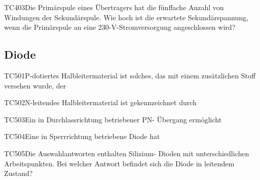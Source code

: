 \begin{question}{TC403}{Die Primärspule eines Übertragers hat die fünffache Anzahl von Windungen der Sekundärspule. Wie hoch ist die erwartete Sekundärspannung, wenn die Primärspule an eine 230-V-Stromversorgung angeschlossen wird?}
\end{question}

\subsection{Diode}

\begin{question}{TC501}{P-dotiertes Halbleitermaterial ist solches, das mit einem zusätzlichen Stoff versehen wurde, der}
\end{question}

\begin{question}{TC502}{N-leitendes Halbleitermaterial ist gekennzeichnet durch}
\end{question}

\begin{question}{TC503}{Ein in Durchlassrichtung betriebener PN- Übergang ermöglicht}
\end{question}

\begin{question}{TC504}{Eine in Sperrrichtung betriebene Diode hat}
\end{question}

\begin{question}{TC505}{Die Auswahlantworten enthalten Silizium- Dioden mit unterschiedlichen Arbeitspunkten. Bei welcher Antwort befindet sich die Diode in leitendem Zustand?}
\end{question}

